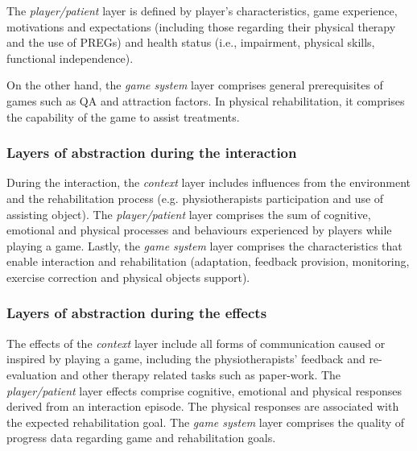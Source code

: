 The \textit{player/patient} layer is defined by player's characteristics, game experience, motivations and expectations (including those regarding their physical therapy and the use of \acp{PREG}) and health status (i.e., impairment, physical skills, functional independence). 

On the other hand, the \textit{game system} layer comprises general prerequisites of games such as \ac{QA} and attraction factors. In physical rehabilitation, it comprises the capability of the game to assist treatments.

\subsubsection*{Layers of abstraction during the interaction}
During the interaction, the \textit{context} layer includes influences from the environment and the rehabilitation process (e.g. physiotherapists participation and use of assisting object). The \textit{player/patient} layer comprises the sum of cognitive, emotional and physical processes and behaviours experienced by players while playing a game. Lastly, the \textit{game system} layer comprises the characteristics that enable interaction and rehabilitation (adaptation, feedback provision, monitoring, exercise correction and physical objects support).

\subsubsection*{Layers of abstraction during the effects}
The effects of the \textit{context} layer include all forms of communication caused or inspired by playing a game, including the physiotherapists' feedback and re-evaluation and other therapy related tasks such as paper-work. The \textit{player/patient} layer effects comprise cognitive, emotional and physical responses derived from an interaction episode. The physical responses are associated with the expected rehabilitation goal. The \textit{game system} layer comprises the quality of progress data regarding game and rehabilitation goals.

